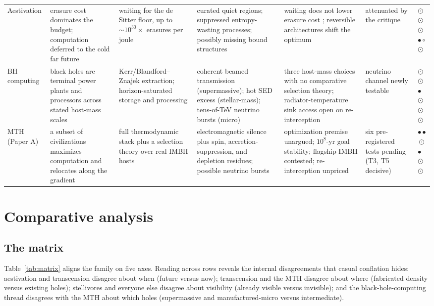 \documentclass[11pt]{article}
\newcommand{\sfull}{\ensuremath{\bullet}}   %
\newcommand{\shalf}{\ensuremath{\odot}} %
\newcommand{\snone}{\ensuremath{\circ}}     %
\begin{document}
\begin{table}[tbp]
\begin{tabular}{p{1.70cm}p{2.05cm}p{2.05cm}p{2.30cm}p{2.45cm}p{1.50cm}p{1.70cm}}
Aestivation \citep{Sandberg2016} & erasure cost dominates the budget; computation deferred to the cold far future & waiting for the de Sitter floor, up to $\sim10^{30}\times$ erasures per joule & curated quiet regions; suppressed entropy-wasting processes; possibly missing bound structures & waiting does not lower erasure cost \citep{Bennett2019}; reversible architectures shift the optimum & attenuated by the critique & \shalf\,\shalf\,\shalf\,\sfull\,\snone\,\shalf \\
BH computing \citep{Inoue2011,Hsiao2021,Dvali2023} & black holes are terminal power plants and processors across stated host-mass scales & Kerr/Blandford--Znajek extraction; horizon-saturated storage and processing & coherent beamed transmission (supermassive); hot SED excess (stellar-mass); tens-of-TeV neutrino bursts (micro) & three host-mass choices with no comparative selection theory; radiator-temperature sink access open on re-interception & neutrino channel newly testable & \shalf\,\shalf\,\sfull\,\shalf\,\shalf\,\shalf \\
MTH (Paper A) & a subset of civilizations maximizes computation and relocates along the gradient & full thermodynamic stack plus a selection theory over real IMBH hosts & electromagnetic silence plus spin, accretion-suppression, and depletion residues; possible neutrino bursts & optimization premise unargued; $10^{8}$-yr goal stability; flagship IMBH contested; re-interception unpriced & six pre-registered tests pending (T3, T5 decisive) & \sfull\,\sfull\,\shalf\,\sfull\,\shalf\,\shalf \\
\bottomrule
\end{tabular}
\end{table}

\section{Comparative analysis}
\label{sec:comparison}

\subsection{The matrix}

Table~\ref{tab:matrix} aligns the family on five axes. Reading across rows reveals the internal disagreements that casual conflation hides: aestivation and transcension disagree about when (future versus now); transcension and the MTH disagree about where (fabricated density versus existing holes); stellivores and everyone else disagree about visibility (already visible versus invisible); and the black-hole-computing thread disagrees with the MTH about which holes (supermassive and manufactured-micro versus intermediate).
\end{document}
